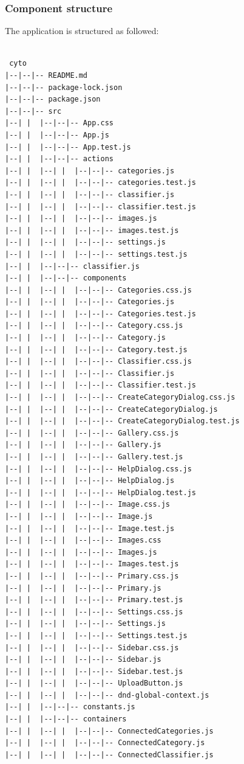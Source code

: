  
\subsubsection{Component structure}
The application is structured as followed:
\begin{verbatim}

 cyto
|--|--|-- README.md
|--|--|-- package-lock.json
|--|--|-- package.json
|--|--|-- src
|--| |  |--|--|-- App.css
|--| |  |--|--|-- App.js
|--| |  |--|--|-- App.test.js
|--| |  |--|--|-- actions
|--| |  |--| |  |--|--|-- categories.js
|--| |  |--| |  |--|--|-- categories.test.js
|--| |  |--| |  |--|--|-- classifier.js
|--| |  |--| |  |--|--|-- classifier.test.js
|--| |  |--| |  |--|--|-- images.js
|--| |  |--| |  |--|--|-- images.test.js
|--| |  |--| |  |--|--|-- settings.js
|--| |  |--| |  |--|--|-- settings.test.js
|--| |  |--|--|-- classifier.js
|--| |  |--|--|-- components
|--| |  |--| |  |--|--|-- Categories.css.js
|--| |  |--| |  |--|--|-- Categories.js
|--| |  |--| |  |--|--|-- Categories.test.js
|--| |  |--| |  |--|--|-- Category.css.js
|--| |  |--| |  |--|--|-- Category.js
|--| |  |--| |  |--|--|-- Category.test.js
|--| |  |--| |  |--|--|-- Classifier.css.js
|--| |  |--| |  |--|--|-- Classifier.js
|--| |  |--| |  |--|--|-- Classifier.test.js
|--| |  |--| |  |--|--|-- CreateCategoryDialog.css.js
|--| |  |--| |  |--|--|-- CreateCategoryDialog.js
|--| |  |--| |  |--|--|-- CreateCategoryDialog.test.js
|--| |  |--| |  |--|--|-- Gallery.css.js
|--| |  |--| |  |--|--|-- Gallery.js
|--| |  |--| |  |--|--|-- Gallery.test.js
|--| |  |--| |  |--|--|-- HelpDialog.css.js
|--| |  |--| |  |--|--|-- HelpDialog.js
|--| |  |--| |  |--|--|-- HelpDialog.test.js
|--| |  |--| |  |--|--|-- Image.css.js
|--| |  |--| |  |--|--|-- Image.js
|--| |  |--| |  |--|--|-- Image.test.js
|--| |  |--| |  |--|--|-- Images.css
|--| |  |--| |  |--|--|-- Images.js
|--| |  |--| |  |--|--|-- Images.test.js
|--| |  |--| |  |--|--|-- Primary.css.js
|--| |  |--| |  |--|--|-- Primary.js
|--| |  |--| |  |--|--|-- Primary.test.js
|--| |  |--| |  |--|--|-- Settings.css.js
|--| |  |--| |  |--|--|-- Settings.js
|--| |  |--| |  |--|--|-- Settings.test.js
|--| |  |--| |  |--|--|-- Sidebar.css.js
|--| |  |--| |  |--|--|-- Sidebar.js
|--| |  |--| |  |--|--|-- Sidebar.test.js
|--| |  |--| |  |--|--|-- UploadButton.js
|--| |  |--| |  |--|--|-- dnd-global-context.js
|--| |  |--|--|-- constants.js
|--| |  |--|--|-- containers
|--| |  |--| |  |--|--|-- ConnectedCategories.js
|--| |  |--| |  |--|--|-- ConnectedCategory.js
|--| |  |--| |  |--|--|-- ConnectedClassifier.js

\end{verbatim}
